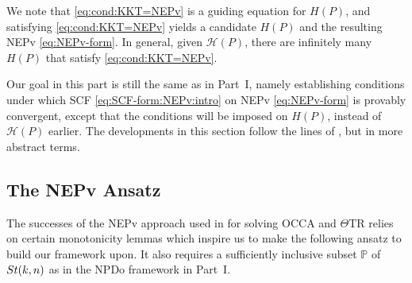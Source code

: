 \documentclass[11pt]{article}
\def\bbP{\mathbb{P}}
\def\bbR{\mathbb{R}}
\def\scrH{\mathscr{H}}
\newcommand\STM[2]{{\rm St}(#1,#2)}
\def\Blue{\textcolor{blue}}
\theoremstyle{definition}
\numberwithin{equation}{section}
\begin{document}
We note that \eqref{eq:cond:KKT=NEPv} is a guiding equation for $H(P)$, and satisfying \eqref{eq:cond:KKT=NEPv}
yields a candidate $H(P)$ and the resulting NEPv \eqref{eq:NEPv-form}.
In general, given $\scrH(P)$, there are infinitely many $H(P)$
that satisfy \eqref{eq:cond:KKT=NEPv}.


Our goal in this part is still the same as
in Part~I, namely establishing conditions under which SCF \eqref{eq:SCF-form:NEPv:intro} on NEPv \eqref{eq:NEPv-form} is provably convergent,
except that the conditions will be imposed on $H(P)$, instead of $\scrH(P)$ earlier.
The developments in this section follow the lines of \cite{wazl:2023,zhwb:2022}, but in more abstract terms.

\subsection{The NEPv Ansatz}\label{ssec:NEPvAssum}
The successes of the NEPv approach used in \cite{wazl:2023,zhwb:2022} for solving
OCCA and $\Theta$TR relies on certain monotonicity lemmas which inspire us to make the following
ansatz to build our framework upon. It also requires a sufficiently inclusive subset $\bbP$ of
$\STM{k}{n}$ as in the NPDo framework in Part~I.
\end{document}
